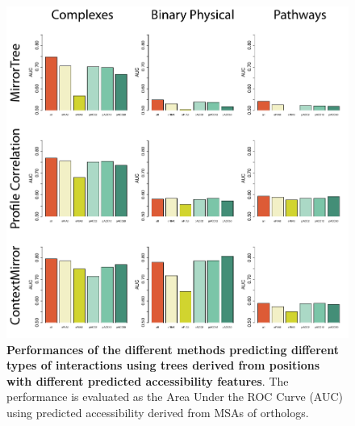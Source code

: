 \begin{figure}[htbp]
\centering
\includegraphics[keepaspectratio,width=\textwidth,height=0.75\textheight]{../figures/accsROCs_orthologs.pdf}
\caption{\textbf{Performances of the different methods predicting different types of interactions using trees derived from positions with different predicted accessibility features}. The performance is evaluated as the Area Under the ROC Curve (AUC) using predicted accessibility derived from MSAs of orthologs.}
\label{accsrocs_orthologs.pdf}
\end{figure}

